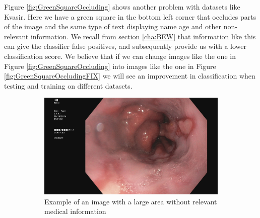 Figure \ref{fig:GreenSquareOccluding} shows another problem with datasets like Kvasir.  Here we have a green square in the bottom left corner that occludes parts of the image and the same type of text displaying name age and other non-relevant information. We recall from section \ref{cha:BEW} that information like this can give the classifier false positives, and subsequently provide us with a lower classification score. 
We believe that if we can change images like the one in Figure \ref{fig:GreenSquareOccluding} into images like the one in Figure \ref{fig:GreenSquareOccludingFIX} we will see an improvement in classification when testing and training on different datasets.


\begin{figure}
     \centering
     \begin{subfigure}[t]{0.4\textwidth}
         \centering
         \includegraphics[height=\textwidth, width=\textwidth]{experiments/figures/leftframe.jpg}
         \caption{Example of an image with a large area without relevant medical information}
         \label{fig:LargeLeftBlack}
     \end{subfigure}
     \hfill
     \begin{subfigure}[t]{0.4\textwidth}
         \centering

\end{subfigure}
\end{figure}
